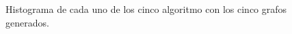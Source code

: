 \documentclass{article}
\begin{document}
\begin{figure}[htbp]
\caption{Histograma de cada uno de los cinco algoritmo con los cinco grafos generados.} 
\end{figure}
\end{document}

